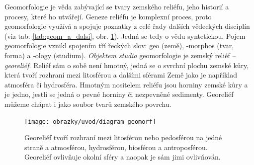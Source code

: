 Geomorfologie je věda zabývající se tvary zemského reliéfu, jeho historií a procesy, které ho utvářejí. Geneze reliéfu je komplexní proces, proto geomorfologie využívá a spojuje poznatky z celé řady dalších vědeckých disciplín (viz tab. \ref{tab:geom_a_dalsi}, obr. \ref{fig:diagramgeomorf}). Jedná se tedy o vědu syntetickou. Pojem geomorfologie vznikl spojením tří řeckých slov: geo (země), -morphos (tvar, forma) a -ology (studium).
\emph{Objektem studia} geomorfologie je zemský reliéf -- \emph{georeliéf}. Reliéf sám o sobě není hmotný, jedná se o svrchní plochu zemské kůry, která tvoří rozhraní mezi litosférou a dalšími sférami Země jako je například atmosféra či hydrosféra. Hmotným nositelem reliéfu jsou horniny zemské kůry a je jedno, jestli se jedná o pevné horniny či nezpevněné sedimenty. Georeliéf můžeme chápat i jako soubor tvarů zemského povrchu.

\begin{figure}[h]
	\centering
	\texttt{[image: obrazky/uvod/diagram\_geomorf]}
	\caption{Georeliéf tvoří rozhraní mezi litosférou nebo pedosférou na jedné straně a atmosférou, hydrosférou, biosférou a antroposférou. Georeliéf ovlivňuje okolní sféry a naopak je sám jimi ovlivňován.}
	\label{fig:diagramgeomorf}
\end{figure}


